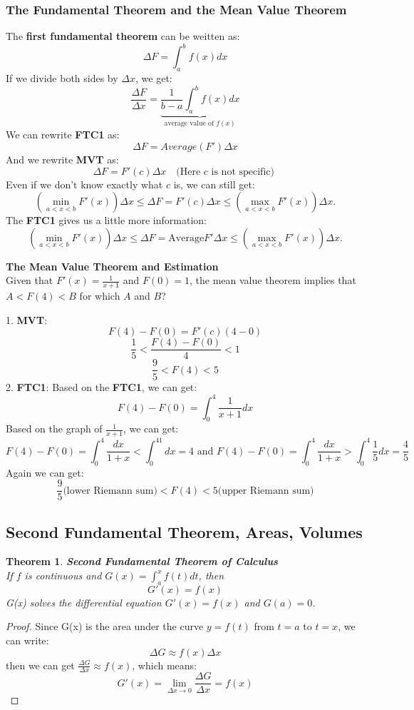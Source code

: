 \documentclass[10pt, a4paper]{article}
\newtheorem{theorem}{Theorem}
\begin{document}
\subsubsection*{The Fundamental Theorem and the Mean Value Theorem}
The \textbf{first fundamental theorem} can be weitten as:
\[\Delta F = \int_a^b f(x)dx\]
If we divide both sides by $\Delta x$, we get:
\[\frac{\Delta F}{\Delta x} = \underbrace{\frac{1}{b-a}\int_a^b f(x)dx} _{\text{average value of } f(x)}\]
We can rewrite \textbf{FTC1} as:
\[\Delta F = Average(F')\Delta x \]
And we rewrite \textbf{MVT} as:
\[\Delta F = F'(c)\Delta x \quad \text{(Here $c$ is not specific) }\]
Even if we don't know exactly what $c$ is, we can still get:
\[\left(\min_{a<x<b}F'(x)\right)\Delta x\leq\Delta F=F'(c)\Delta x\leq\left(\max_{a<x<b}F'(x)\right)\Delta x.\]
The \textbf{FTC1} gives us a little more information:
\[\left(\min_{a<x<b}F'(x)\right)\Delta x\leq\Delta F=\text{Average}F'\Delta x\leq\left(\max_{a<x<b}F'(x)\right)\Delta x.\]

\begin{Problem}
    \textbf{The Mean Value Theorem and Estimation} \\
    Given that $F'(x)  = \frac{1}{x+1}$ and $F(0) = 1$, the mean value theorem implies that $A < F(4) < B$ for which $A$ and $B$?
\end{Problem}
1. \textbf{MVT}:
\[F(4) - F(0) = F'(c)(4 - 0)\]
\[\frac{1}{5} < \frac{F(4) - F(0)}{4} < 1\]
\[\frac{9}{5} < F(4) < 5\]
2. \textbf{FTC1}:
Based on the \textbf{FTC1}, we can get:
\[F(4) - F(0) = \int_0^4 \frac{1}{x+1}dx\]
Based on the graph of $\frac{1}{x+1}$, we can get:
\[F(4)-F(0)=\int_0^4\frac{dx}{1+x}<\int_0^41dx=4 \text{ and } F(4) - F(0) = \int_0^4 \frac{dx}{1+x} > \int_0^4\frac{1}{5}dx = \frac{4}{5}\]
Again we can get:
\[\frac{9}{5}\text{(lower Riemann sum)} < F(4) < 5\text{(upper Riemann sum)}\]

\subsection{Second Fundamental Theorem, Areas, Volumes}
\begin{theorem}
    \textbf{Second Fundamental Theorem of Calculus} \\
    If $f$ is continuous and $ G(x) = \int_a^x f(t)dt$, then 
    \[\boxed{G'(x) = f(x)}\]
    G(x) solves the differential equation $G'(x) = f(x)$ and $G(a) = 0$.
\end{theorem}

\begin{proof}
    Since G(x) is the area under the curve $y = f(t)$ from $t = a$ to $t = x$, we can write:
    \[\Delta G \approx f(x)\Delta x\]
    then we can get $\frac{\Delta G}{\Delta x} \approx f(x)$, which means:
    \[G'(x) = \lim_{\Delta x\to0}\frac{\Delta G}{\Delta x} = f(x)\] 
\end{proof}    
\end{document}
